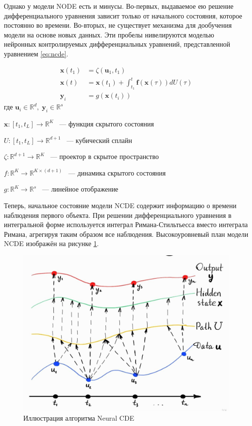 \documentclass[a4paper, 12pt]{article}
\newcommand{\bx}{\mathbf{x}}
\newcommand{\by}{\mathbf{y}}
\newcommand{\bff}{\mathbf{f}}
\newcommand{\bu}{\mathbf{u}}
\newcommand{\dR}{\mathds{R}}
\begin{document}
	Однако у модели NODE есть и минусы.
	Во-первых, выдаваемое ею решение дифференциального уравнения зависит только от начального состояния, которое постоянно во времени.
	Во-вторых, не существует механизма для дообучения модели на основе новых данных.
	Эти пробелы нивелируются моделью нейронных контролируемых дифференциальных уравнений, представленной уравнением \ref{eq:ncde}.
	
	\begin{equation}\label{eq:ncde}
		\begin{aligned}
			\bx(t_1) &= \zeta(\bu_1, t_1) \\
			\bx(t) &= \bx(t_1) + \int_{t_1}^t \bff(\bx(\tau))dU(\tau) \\
			\by_i &= g(\bx(t_i))
		\end{aligned}
	\end{equation}
	$\text{где } \bu_i \in \dR^d, \; \by_i \in \dR^s $
	
	$\bx: [t_1, t_L] \rightarrow \dR^K$ ~--- функция скрытого состояния
	
	$U: [t_1, t_L] \rightarrow \dR^{d+1}$ ~--- кубический сплайн 
	
	$\zeta: \dR^{d+1} \rightarrow \dR^K$ ~--- проектор в скрытое пространство
	
	$f: \dR^K \rightarrow \dR^{K \times (d+1)}$ ~--- динамика скрытого состояния

	$g: \dR^K \rightarrow \dR^s$ ~--- линейное отображение
	
	Теперь, начальное состояние модели NCDE содержит информацию о времени наблюдения первого объекта.
	При решении дифференциального уравнения в интегральной форме используется интеграл Римана-Стильтьесса вместо интеграла Римана, агрегируя таким образом все наблюдения.
	Высокоуровневый план модели NCDE изображён на рисунке \ref{fig:ncde}.
	
	\begin{figure}[bhtp]
		\includegraphics[width=\textwidth]{neural-cde-path.jpg}
		\caption{Иллюстрация алгоритма Neural CDE}
		\label{fig:ncde}
	\end{figure}
	
\end{document}

